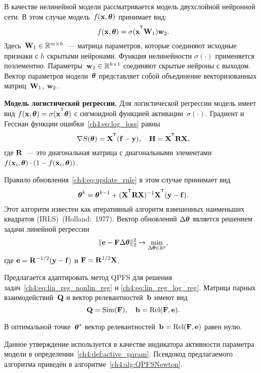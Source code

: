 \documentclass[11pt, a5paper]{dissert}
\begin{document}
В качестве нелинейной модели рассматривается модель двухслойной нейронной сети. В этом случае модель~$f (\mathbf{x}, \boldsymbol{\theta})$ принимает вид:
\[
	f(\bx, \btheta) = \sigma(\bx^{\T} \bW_1) \bw_2.
\]
Здесь~$\mathbf{W}_1 \in \mathbb{R}^{m \times h}$~--- матрица параметров, которые соединяют исходные признаки с $h$ скрытыми нейронами. Функция нелинейности $\sigma(\cdot)$ применяется поэлементно. Параметры~$\mathbf{w}_2 \in \mathbb{R}^{h \times 1}$ соединяют скрытые нейроны с выходом. 
Вектор параметров модели~$\boldsymbol{\theta}$ представляет собой объединение векторизованных матриц~$\mathbf{W}_1$, $\mathbf{w}_2$.

\textbf{Модель логистической регрессии.}
Для логистической регрессии модель имеет вид $f(\bx , \btheta) = \sigma(\bx^{\T} \btheta)$ с сигмоидной функцией активации~$\sigma(\cdot)$.
Градиент и Гессиан функции ошибки~\eqref{ch4:eq:log_loss} равны
\begin{equation}
	\nabla S(\btheta) = \bX^{\T} (\mathbf{f} - \by), \quad \bH = \bX^{\T} \bR \bX,
	\label{ch4:eq:log_reg_deriv}
\end{equation}
где $\mathbf{R}$~--- это диагональная матрица с диагональными элементами $f(\mathbf{x}_i , \boldsymbol{\theta}) \cdot (1 - f(\mathbf{x}_i , \boldsymbol{\theta}))$.

Правило обновления~\eqref{ch4:eq:update_rule} в этом случае принимает вид
\[
	\btheta^k = \btheta^{k - 1} + (\bX^{\T} \bR \bX)^{-1} \bX^{\T} (\by - \mathbf{f}).
\]
Этот алгоритм известен как итеративный алгоритм взвешенных наименьших квадратов (IRLS)~(Holland:~1977). Вектор обновлений $\Delta \boldsymbol{\theta}$ является решением задачи линейной регрессии
\begin{equation}
	\| \mathbf{e} - \mathbf{F} \Delta \boldsymbol{\theta} \|_2^2 \rightarrow \min_{\Delta \boldsymbol{\theta} \in \mathbb{R}^{p}},
	\label{ch4:eq:lin_reg_log_reg}
\end{equation}
где $\mathbf{e} = \mathbf{R}^{-1/2} (\mathbf{y} - \mathbf{f})$ и $\mathbf{F} = \mathbf{R}^{1/2}\mathbf{X}$.

Предлагается адаптировать метод QPFS для решения задач~\eqref{ch4:eq:lin_reg_nonlin_reg} и \eqref{ch4:eq:lin_reg_log_reg}. 
Матрица парных взаимодействий~$\mathbf{Q}$ и вектор релевантностей~$\mathbf{b}$ имеют вид
\[
	\mathbf{Q} = \text{Sim} (\mathbf{F}), \quad \mathbf{b} = \text{Rel} (\mathbf{F}, \mathbf{e}).
\]
\begin{statement}
	В оптимальной точке~$\boldsymbol{\theta}^*$ вектор релевантностей~$\mathbf{b} = \text{Rel} (\mathbf{F}, \mathbf{e})$ равен нулю.
\end{statement}
Данное утверждение используется в качестве индикатора активности параметра модели в определении~\ref{ch4:def:active_param}.
Псевдокод предлагаемого алгоритма приведён в алгоритме~\ref{ch4:alg:QPFSNewton}.
\end{document}
